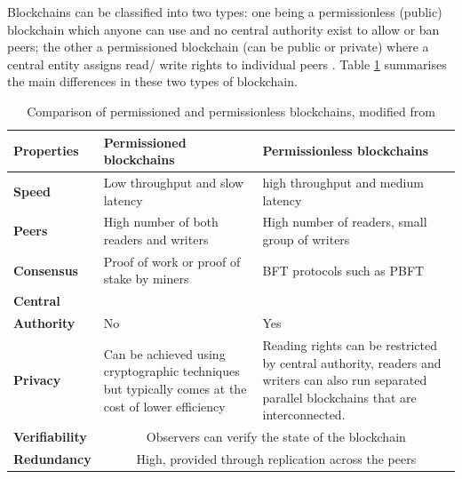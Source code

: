 Blockchains can be classified into two types: one being a permissionless (public) blockchain which anyone can
use and no central authority exist to allow or ban peers; the other a permissioned blockchain (can be public or private)
where a central entity assigns read/ write rights to individual peers \citep[p.1]{wust2017you}. Table \ref{table:permvsless}
summarises the main differences in these two types of blockchain.

\begin{table}[!ht]
	\caption[Comparison of permissioned and permissionless blockchains]
	{Comparison of permissioned and permissionless blockchains, modified from \citet[p.3]{wust2017you}}
	\centering
	\label{table:permvsless}
	\begin{tabularx}{\textwidth}{>{\bfseries}lXX}
		Properties    & Permissioned blockchains                                                                           & Permissionless blockchains                     \\
		\toprule
		Speed         & Low throughput and slow latency                                                                    & high throughput and medium latency             \\\midrule
		Peers         & High number of both readers and writers                                                            & High number of readers, small group of writers \\\midrule
		Consensus     & Proof of work or proof of stake by miners                                                          & BFT protocols such as PBFT                     \\\midrule
		Central                                                                                                                                                             \\Authority & No & Yes\\\midrule
		Privacy       & Can be achieved using cryptographic techniques but typically comes at the cost of lower efficiency &
		Reading rights can be restricted by central authority, readers and writers can also run separated parallel blockchains that are interconnected.                     \\\midrule
		Verifiability & \multicolumn{2}{c}{Observers can verify the state of the blockchain}                                                                                \\\midrule
		Redundancy    & \multicolumn{2}{c}{High, provided through replication across the peers}
		\\\bottomrule
	\end{tabularx}
\end{table}

